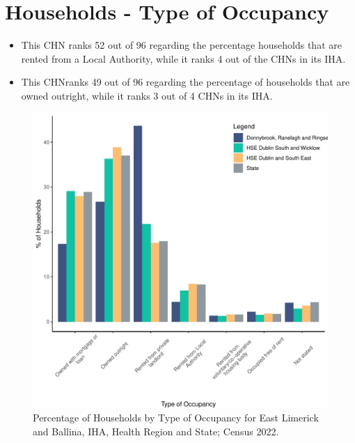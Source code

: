 \documentclass{article}
\begin{document}
\section{Households - Type of Occupancy}\label{sect:Households}
\begin{itemize}
\item This CHN ranks  52 out of 96 regarding the percentage households that are rented from a Local Authority, while it ranks  4 out of the CHNs in its IHA. 
\item This CHNranks  49 out of 96 regarding the percentage of households that are owned outright, while it ranks   3 out of 4 CHNs in its IHA.
\end{itemize}
\begin{figure}[H]
	\centering
	\includegraphics[width = 140mm]{../figures/HouseholdsED.pdf}
	\caption{Percentage of Households by Type of Occupancy for East Limerick and Ballina, IHA, Health Region and State; Census 2022.}
	\label{fig:vbnv}
	\end{figure}
\end{document}
